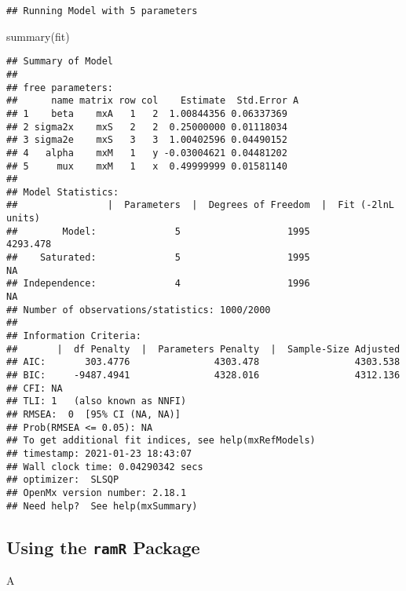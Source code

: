 \documentclass[
]{book}
\newenvironment{Shaded}{\begin{snugshade}}{\end{snugshade}}
\newcommand{\FunctionTok}[1]{\textcolor[rgb]{0.00,0.00,0.00}{#1}}
\newcommand{\NormalTok}[1]{#1}
\theoremstyle{definition}
\theoremstyle{definition}
\theoremstyle{definition}
\theoremstyle{remark}
\begin{document}
\begin{verbatim}
## Running Model with 5 parameters
\end{verbatim}

\begin{Shaded}
\begin{Highlighting}[]
\FunctionTok{summary}\NormalTok{(fit)}
\end{Highlighting}
\end{Shaded}

\begin{verbatim}
## Summary of Model 
##  
## free parameters:
##      name matrix row col    Estimate  Std.Error A
## 1    beta    mxA   1   2  1.00844356 0.06337369  
## 2 sigma2x    mxS   2   2  0.25000000 0.01118034  
## 3 sigma2e    mxS   3   3  1.00402596 0.04490152  
## 4   alpha    mxM   1   y -0.03004621 0.04481202  
## 5     mux    mxM   1   x  0.49999999 0.01581140  
## 
## Model Statistics: 
##                |  Parameters  |  Degrees of Freedom  |  Fit (-2lnL units)
##        Model:              5                   1995              4293.478
##    Saturated:              5                   1995                    NA
## Independence:              4                   1996                    NA
## Number of observations/statistics: 1000/2000
## 
## Information Criteria: 
##       |  df Penalty  |  Parameters Penalty  |  Sample-Size Adjusted
## AIC:       303.4776               4303.478                 4303.538
## BIC:     -9487.4941               4328.016                 4312.136
## CFI: NA 
## TLI: 1   (also known as NNFI) 
## RMSEA:  0  [95% CI (NA, NA)]
## Prob(RMSEA <= 0.05): NA
## To get additional fit indices, see help(mxRefModels)
## timestamp: 2021-01-23 18:43:07 
## Wall clock time: 0.04290342 secs 
## optimizer:  SLSQP 
## OpenMx version number: 2.18.1 
## Need help?  See help(mxSummary)
\end{verbatim}

\hypertarget{using-the-ramr-package-1}{%
\subsection{\texorpdfstring{Using the \texttt{ramR} Package}{Using the ramR Package}}\label{using-the-ramr-package-1}}

\begin{Shaded}
\begin{Highlighting}[]
\NormalTok{A}
\end{Highlighting}
\end{Shaded}
\end{document}
